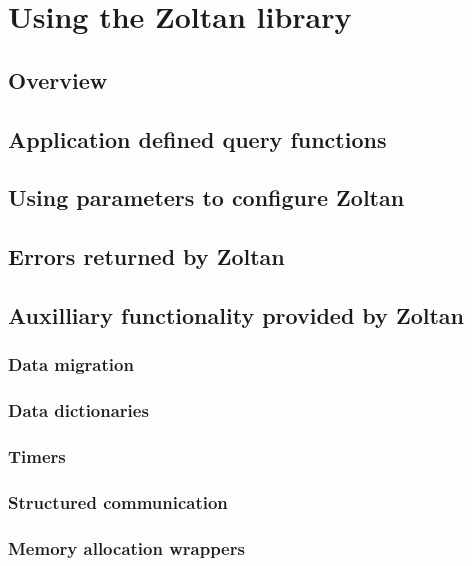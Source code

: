 %
%
\chapter{Using the Zoltan library}
\label{cha:using}


\section{Overview}

\section{Application defined query functions}

\section{Using parameters to configure Zoltan}

\section{Errors returned by Zoltan}

\section{Auxilliary functionality provided by Zoltan}

\subsection{Data migration}
\subsection{Data dictionaries}
\subsection{Timers}
\subsection{Structured communication}
\subsection{Memory allocation wrappers}
